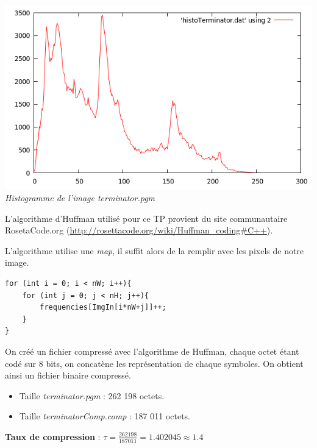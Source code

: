 \documentclass[a4paper,11pt]{article}
\begin{document}
\begin{center}
\includegraphics[scale=0.5]{./histoTerminatorPGM_GNU.png}\\
\textit{Histogramme de l'image terminator.pgm}
\end{center}

L'algorithme d'Huffman utilisé pour ce TP provient du site communautaire RosetaCode.org (\href{http://rosettacode.org/wiki/Huffman_coding#C.2B.2B}{{http://rosettacode.org/wiki/Huffman\_coding\#C++}}).

L'algorithme utilise une \textit{map}, il suffit alors de la remplir avec les pixels de notre image.

\begin{verbatim}
for (int i = 0; i < nW; i++){
    for (int j = 0; j < nH; j++){
        frequencies[ImgIn[i*nW+j]]++;
    }
}
\end{verbatim}

On créé un fichier compressé avec l'algorithme de Huffman, chaque octet étant codé sur 8 bits, on concatène les représentation de chaque symboles. On obtient ainsi un fichier binaire compressé.

\vspace{0,5cm}

\begin{itemize}
\item Taille \textit{terminator.pgm} : 262 198 octets.
\item Taille \textit{terminatorComp.comp} : 187 011 octets.
\end{itemize}

\vspace{0,2cm}

\textbf{Taux de compression} : $\tau = \frac{262 198}{187 011} = 1.402045 \approx 1.4$
\end{document}
